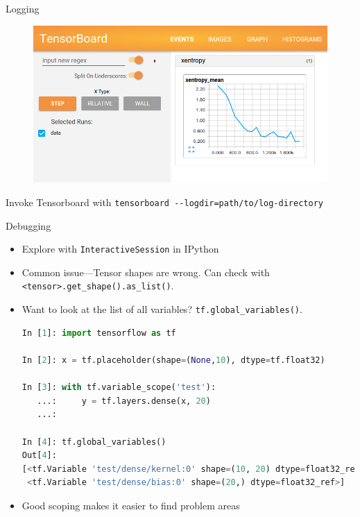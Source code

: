 \documentclass[]{beamer}
\begin{document}
\begin{frame}[fragile]{Logging}

\begin{figure}
  \centering
  \includegraphics[width=0.8\linewidth]{mnist_tensorboard.png}
\end{figure}

Invoke Tensorboard with \verb|tensorboard --logdir=path/to/log-directory|

\end{frame}

\begin{frame}[fragile]{Debugging}

\begin{itemize}
\item Explore with \verb|InteractiveSession| in IPython
\item Common issue---Tensor shapes are wrong. Can check with \verb|<tensor>.get_shape().as_list()|.
\item Want to look at the list of all variables? \verb|tf.global_variables()|.

\lstset{style=mystyle2}
\begin{lstlisting}[language=python]
In [1]: import tensorflow as tf

In [2]: x = tf.placeholder(shape=(None,10), dtype=tf.float32)

In [3]: with tf.variable_scope('test'):
   ...:     y = tf.layers.dense(x, 20)
   ...:     

In [4]: tf.global_variables()
Out[4]: 
[<tf.Variable 'test/dense/kernel:0' shape=(10, 20) dtype=float32_ref>,
 <tf.Variable 'test/dense/bias:0' shape=(20,) dtype=float32_ref>]
\end{lstlisting}
\item Good scoping makes it easier to find problem areas
\end{itemize}


\end{frame}
\end{document}
